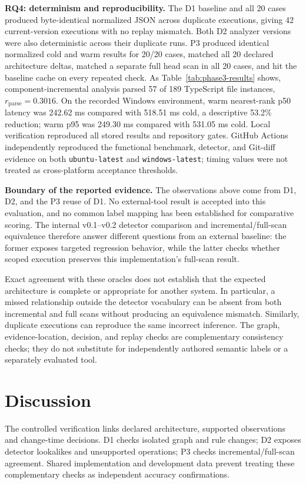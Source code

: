 \documentclass[conference]{IEEEtran}
\begin{document}
\textbf{RQ4: determinism and reproducibility.}
The D1 baseline and all 20 cases produced byte-identical normalized JSON across duplicate executions, giving 42 current-version executions with no replay mismatch. Both D2 analyzer versions were also deterministic across their duplicate runs. P3 produced identical normalized cold and warm results for 20/20 cases, matched all 20 declared architecture deltas, matched a separate full head scan in all 20 cases, and hit the baseline cache on every repeated check. As Table~\ref{tab:phase3-results} shows, component-incremental analysis parsed 57 of 189 TypeScript file instances, $r_{\mathrm{parse}}=0.3016$. On the recorded Windows environment, warm nearest-rank p50 latency was 242.62 ms compared with 518.51 ms cold, a descriptive 53.2\% reduction; warm p95 was 249.30 ms compared with 531.05 ms cold. Local verification reproduced all stored results and repository gates. GitHub Actions independently reproduced the functional benchmark, detector, and Git-diff evidence on both \texttt{ubuntu-latest} and \texttt{windows-latest}; timing values were not treated as cross-platform acceptance thresholds.

\textbf{Boundary of the reported evidence.}
The observations above come from D1, D2, and the P3 reuse of D1. No external-tool result is accepted into this evaluation, and no common label mapping has been established for comparative scoring. The internal v0.1--v0.2 detector comparison and incremental/full-scan equivalence therefore answer different questions from an external baseline: the former exposes targeted regression behavior, while the latter checks whether scoped execution preserves this implementation's full-scan result.

Exact agreement with these oracles does not establish that the expected architecture is complete or appropriate for another system. In particular, a missed relationship outside the detector vocabulary can be absent from both incremental and full scans without producing an equivalence mismatch. Similarly, duplicate executions can reproduce the same incorrect inference. The graph, evidence-location, decision, and replay checks are complementary consistency checks; they do not substitute for independently authored semantic labels or a separately evaluated tool.

\section{Discussion}

The controlled verification links declared architecture, supported observations and change-time decisions. D1 checks isolated graph and rule changes; D2 exposes detector lookalikes and unsupported operations; P3 checks incremental/full-scan agreement. Shared implementation and development data prevent treating these complementary checks as independent accuracy confirmations.
\end{document}
